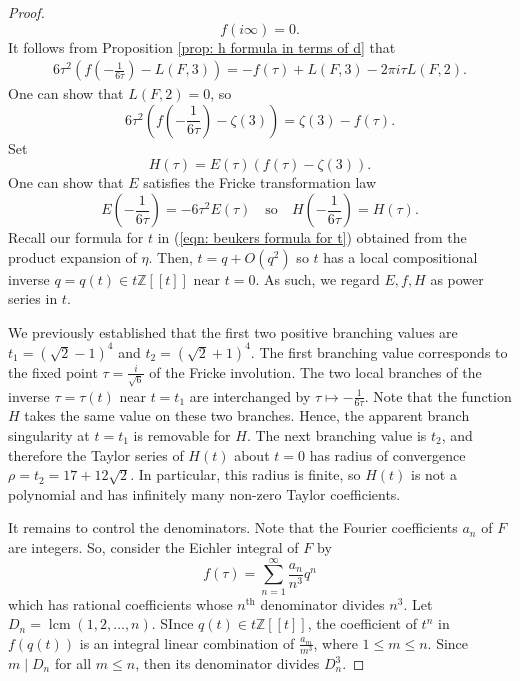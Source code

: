 \documentclass[12pt, a4paper]{amsart}
\theoremstyle{definition}
\numberwithin{theorem}{section}
\begin{document}
\begin{proof}
\[f\left(i\infty\right)=0.
\]
It follows from Proposition \ref{prop: h formula in terms of d} that
\begin{align}\label{eqn: transformation of f}
6\tau^2\left(f\left(-\frac{1}{6\tau}\right)-L\left(F,3\right)\right)=-f\left(\tau\right)+L\left(F,3\right)-2\pi i\tau L\left(F,2\right).
\end{align}
One can show that $L\left(F,2\right)=0$, so \[6\tau^2\left(f\left(-\frac{1}{6\tau}\right)-\zeta\left(3\right)\right)=\zeta\left(3\right)-f\left(\tau\right).\]
Set \[H\left(\tau\right)=E\left(\tau\right)\left(f\left(\tau\right)-\zeta\left(3\right)\right).\]
One can show that $E$ satisfies the Fricke transformation law \[E\left(-\frac{1}{6\tau}\right)=-6\tau^2E\left(\tau\right)\quad\text{so}\quad H\left(-\frac{1}{6\tau}\right)=H\left(\tau\right).\]
Recall our formula for $t$ in (\ref{eqn: beukers formula for t}) obtained from the product expansion of $\eta$. Then, $t=q+O\left(q^2\right)$ so $t$ has a local compositional inverse $q=q\left(t\right)\in t\mathbb{Z}\left[\left[t\right]\right]$ near $t=0$. As such, we regard $E,f,H$ as power series in $t$. 

We previously established that the first two positive branching values are $t_1=(\sqrt{2}-1)^4$ and $t_2=(\sqrt{2}+1)^4$. The first branching value corresponds to the fixed point $\tau=\frac{i}{\sqrt{6}}$ of the Fricke involution. The two local branches of the inverse $\tau=\tau\left(t\right)$ near $t=t_1$ are interchanged by $\tau \mapsto -\frac{1}{6\tau}$. Note that the function $H$ takes the same value on these two branches. Hence, the apparent branch singularity at $t=t_1$ is removable for $H$. The next branching value is $t_2$, and therefore the Taylor series of $H\left(t\right)$ about $t=0$ has radius of convergence $\rho=t_2=17+12\sqrt{2}$. In particular, this radius is finite, so $H\left(t\right)$ is not a polynomial and has infinitely many non-zero Taylor coefficients.

It remains to control the denominators. Note that the Fourier coefficients $a_n$ of $F$ are integers. So, consider the Eichler integral of $F$ by \[f\left(\tau\right)=\sum_{n=1}^{\infty}\frac{a_n}{n^3}q^n\]
which has rational coefficients whose $n^\text{th}$ denominator divides $n^3$. Let $D_n=\operatorname{lcm}\left(1,2,\ldots,n\right)$. SInce $q\left(t\right)\in t\mathbb{Z}\left[\left[t\right]\right]$, the coefficient of $t^n$ in $f\left(q\left(t\right)\right)$ is an integral linear combination of $\frac{a_m}{m^3}$, where $1\le m\le n$. Since $m\mid D_n$ for all $m\le n$, then its denominator divides $D_n^3$. 


\end{proof}
\end{document}
